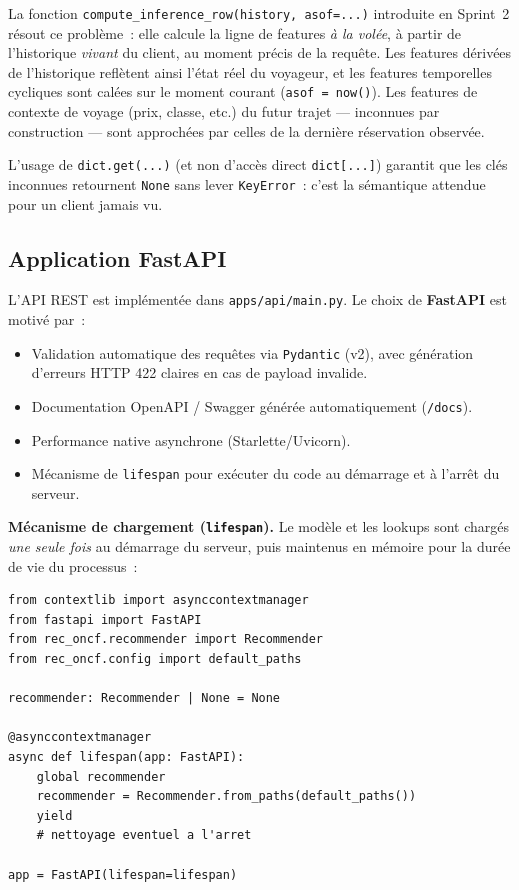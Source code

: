 \documentclass[11pt, a4paper]{article}
\begin{document}
La fonction \texttt{compute\_inference\_row(history, asof=...)} introduite
en Sprint~2 résout ce problème~: elle calcule la ligne de features
\textit{à la volée}, à partir de l'historique \textit{vivant} du client,
au moment précis de la requête. Les features dérivées de l'historique
reflètent ainsi l'état réel du voyageur, et les features temporelles
cycliques sont calées sur le moment courant (\texttt{asof = now()}). Les
features de contexte de voyage (prix, classe, etc.) du futur trajet ---
inconnues par construction --- sont approchées par celles de la dernière
réservation observée.

L'usage de \texttt{dict.get(...)} (et non d'accès direct
\texttt{dict[...]}) garantit que les clés inconnues retournent
\texttt{None} sans lever \texttt{KeyError}~: c'est la sémantique
attendue pour un client jamais vu.

\subsection{Application FastAPI}

L'API REST est implémentée dans \texttt{apps/api/main.py}. Le choix de
\textbf{FastAPI} est motivé par~:
\begin{itemize}
\item Validation automatique des requêtes via \texttt{Pydantic} (v2),
    avec génération d'erreurs HTTP 422 claires en cas de payload
    invalide.
\item Documentation OpenAPI / Swagger générée automatiquement
    (\texttt{/docs}).
\item Performance native asynchrone (Starlette/Uvicorn).
\item Mécanisme de \texttt{lifespan} pour exécuter du code au
    démarrage et à l'arrêt du serveur.
\end{itemize}

\textbf{Mécanisme de chargement (\texttt{lifespan}).}
Le modèle et les lookups sont chargés \textit{une seule fois} au
démarrage du serveur, puis maintenus en mémoire pour la durée de vie
du processus~:

\begin{lstlisting}[style=py, caption={Démarrage de l'application FastAPI}]
from contextlib import asynccontextmanager
from fastapi import FastAPI
from rec_oncf.recommender import Recommender
from rec_oncf.config import default_paths

recommender: Recommender | None = None

@asynccontextmanager
async def lifespan(app: FastAPI):
    global recommender
    recommender = Recommender.from_paths(default_paths())
    yield
    # nettoyage eventuel a l'arret

app = FastAPI(lifespan=lifespan)
\end{lstlisting}
\end{document}
